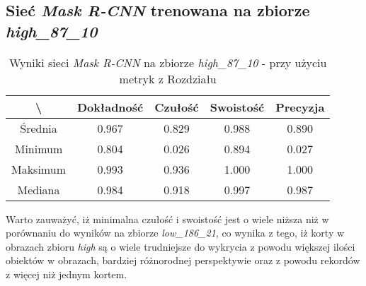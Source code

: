 \subsection{Sieć \textit{Mask R-CNN} trenowana na zbiorze \textit{high\_87\_10}}
\label{sec:results_high_original}

\begin{table}[H]
	\centering
	\caption{Wyniki sieci \textit{Mask R-CNN} na zbiorze \textit{high\_87\_10} - przy użyciu metryk z Rozdziału }
	\vspace{6pt}
	{\footnotesize
		\begin{tabular}{|c|c|c|c|c|}
      \hline \textbackslash & Dokładność & Czułość & Swoistość & Precyzja \\
      \hline Średnia & 0.967 & 0.829 & 0.988 & 0.890 \\
      \hline Minimum & 0.804 & 0.026 & 0.894 & 0.027 \\
      \hline Maksimum & 0.993 & 0.936 & 1.000 & 1.000 \\
      \hline Mediana & 0.984 & 0.918 & 0.997 & 0.987 \\
      \hline
		\end{tabular}
	}
  \vspace{0pt}
  \label{Tab:high_original_calculated}
\end{table}

Warto zauważyć, iż minimalna czułość i swoistość jest o wiele niższa niż w porównaniu do wyników na zbiorze \textit{low\_186\_21}, co wynika z tego, iż korty w obrazach zbioru \textit{high} są o wiele trudniejsze do wykrycia z powodu większej ilości obiektów w obrazach, bardziej różnorodnej perspektywie oraz z powodu rekordów z więcej niż jednym kortem.
